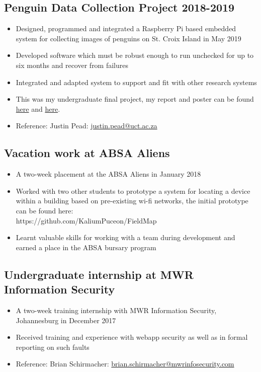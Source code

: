 \documentclass[12pt,a4paper,notitlepage]{article}
\begin{document}
\subsection*{Penguin Data Collection Project 2018-2019}
\begin{itemize}
	\setlength\itemsep{0.02em}
    \item Designed, programmed and integrated a Raspberry Pi based embedded system for collecting images of penguins on St. Croix Island in May 2019
    \item Developed software which must be robust enough to run unchecked for up to six months and recover from failures
    \item Integrated and adapted system to support and fit with other research systems
    \item This was my undergraduate final project, my report and poster can be found \href{https://awful.cloud/upl/thesis.pdf}{here} and \href{https://awful.cloud/upl/poster.pdf}{here}.
    \item Reference: Justin Pead: \href{mailto:justin.pead@uct.ac.za}{justin.pead@uct.ac.za}
\end{itemize}

\subsection*{Vacation work at ABSA Aliens}
\begin{itemize}
	\setlength\itemsep{0.02em}
    \item A two-week placement at the ABSA Aliens in January 2018
    \item Worked with two other students to prototype a system for locating a device within a building based on pre-existing wi-fi networks, the initial prototype can be found here:\\https://github.com/KaliumPuceon/FieldMap
    \item Learnt valuable skills for working with a team during development and earned a place in the ABSA bursary program
\end{itemize}

\subsection*{Undergraduate internship at MWR Information Security}
\begin{itemize}
	\setlength\itemsep{0.02em}
    \item A two-week training internship with MWR Information Security, Johannesburg in December 2017
    \item Received training and experience with webapp security as well as in formal reporting on such faults
    \item Reference: Brian Schirmacher: \href{mailto:brian.schirmacher@mwrinfosecurity.com}{brian.schirmacher@mwrinfosecurity.com}
\end{itemize}
\end{document}
